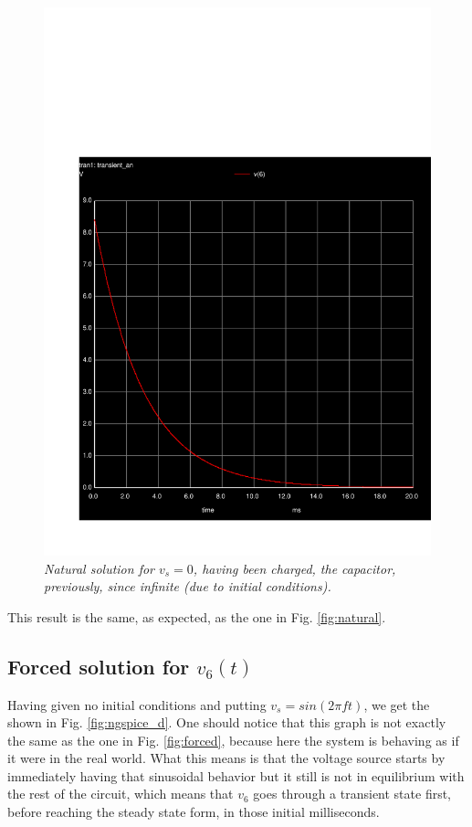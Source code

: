 \vspace{-13mm}
\begin{figure}[H]
    \centering
    \includegraphics[width = 0.85\linewidth]{../sim/trans3.pdf}
        \caption{\textit{Natural solution for $v_s = 0$, having been charged, the capacitor, previously, since infinite (due to initial conditions).}}
    \label{fig:ngspice_c}
\end{figure}

This result is the same, as expected, as the one in Fig. \ref{fig:natural}.

\subsection{Forced solution for $v_6(t)$}

Having given no initial conditions and putting $v_s = sin(2\pi ft)$, we get the shown in Fig. \ref{fig:ngspice_d}. One should notice that this graph is not exactly the same as the one in Fig. \ref{fig:forced}, because here the system is behaving as if it were in the real world. What this means is that the voltage source starts by immediately having that sinusoidal behavior but it still is not in equilibrium with the rest of the circuit, which means that $v_6$ goes through a transient state first, before reaching the steady state form, in those initial milliseconds.

